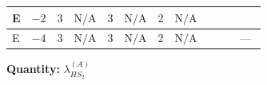 \documentclass[8pt]{article}
\begin{document}
\begin{landscape}
\begin{longtable}{@{}llcccccc >{\raggedright\arraybackslash}p{0.21\linewidth} >{\raggedright\arraybackslash}p{0.21\linewidth} >{\raggedright\arraybackslash}p{0.21\linewidth}@{}}
\midrule
E & $-2$ & $3$ & $\text{N/A}$ & $3$ & $\text{N/A}$ & $2$ & $\text{N/A}$ & \scriptsize\adjustbox{max width=\linewidth}{$\begin{gathered} +8 {\lambda_{HS_2}^{(1)}} {\lambda_{HS_2}^{(A)}}\end{gathered}$} & \scriptsize\adjustbox{max width=\linewidth}{$\begin{gathered} +2 {\lambda_{HS_2}^{(A)}} {\lambda_{S_2}^{(1)}}\end{gathered}$} & \scriptsize\adjustbox{max width=\linewidth}{$\begin{gathered} -\frac{3 {g_1}^2 {\lambda_{HS_2}^{(A)}}}{2}\end{gathered}$} \\
\midrule
E & $-4$ & $3$ & $\text{N/A}$ & $3$ & $\text{N/A}$ & $2$ & $\text{N/A}$ & \scriptsize\adjustbox{max width=\linewidth}{$\begin{gathered} +8 {\lambda_{HS_2}^{(1)}} {\lambda_{HS_2}^{(A)}}\end{gathered}$} & \scriptsize\adjustbox{max width=\linewidth}{$\begin{gathered} +2 {\lambda_{HS_2}^{(A)}} {\lambda_{S_2}^{(1)}}\end{gathered}$} & --- \\
\midrule
\bottomrule
\end{longtable}
\clearpage
\noindent\textbf{Quantity: }$\lambda_{HS_2}^{(A)}$\par\smallskip

\end{landscape}
\end{document}

